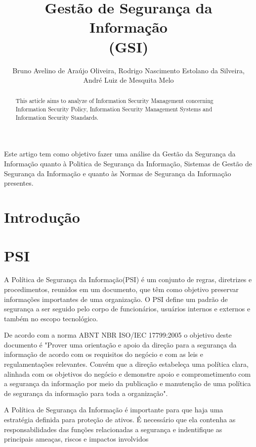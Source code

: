 \documentclass[12pt]{article}
\title{Gestão de Segurança da Informação \\
(GSI)}
\author{Bruno Avelino de Araújo Oliveira, Rodrigo Nascimento Estolano da Silveira, André Luiz de Mesquita Melo }
\begin{document}
 

\maketitle

\begin{abstract}
    This article aims to analyze of Information Security Management concerning Information Security Policy, Information Security Management Systems and Information Security Standards.
\end{abstract}
     
\begin{resumo} 
Este artigo tem como objetivo fazer uma análise da
Gestão da Segurança da Informação quanto à Politica de Segurança da Informação, Sistemas de Gestão de Segurança da Informação e quanto às Normas de Segurança da Informação presentes.


\end{resumo}

\section{Introdução}

\section{PSI}
A Política de Segurança da Informação(PSI) é um conjunto de regras, diretrizes e procedimentos, reunidos em um documento, que
têm como objetivo preservar informações importantes de uma organização. 
O PSI define um padrão de segurança a ser seguido pelo corpo de funcionários, usuários internos e externos e 
também no escopo tecnológico.

De acordo com a norma ABNT NBR ISO/IEC 17799:2005 o objetivo deste documento é
"Prover uma orientação e apoio da direção para a segurança da informação de acordo com os requisitos do negócio e com as leis e regulamentações relevantes. Convém que a direção estabeleça uma política clara, alinhada com os objetivos do negócio e demonstre apoio e comprometimento com a segurança da informação por meio da publicação e manutenção de uma política de segurança da informação para toda a organização".

A Política de Segurança da Informação é importante para que haja uma estratégia definida para proteção de ativos.
É necessário que ela contenha as responsabilidades das funções relacionadas a segurança e indentifique as principais ameaças, riscos e impactos involvidos
\end{document}
